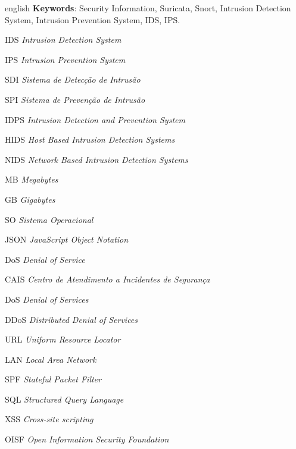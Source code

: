\documentclass[
	12pt,				
	openright,		
	twoside,	
	a4paper,
	english,	
	brazil	
	]{abntex2}
\begin{document}
\begin{resumo}[Abstract]
 \begin{otherlanguage*}{english}
   \vspace{\onelineskip}
   \noindent 
   \textbf{Keywords}: Security Information, Suricata, Snort, Intrusion Detection System, Intrusion Prevention System, IDS, IPS.
 \end{otherlanguage*}
\end{resumo}
\listoffigures*
\cleardoublepage
{}
\listoftables*
\cleardoublepage
\begin{siglas}
  \item[IDS] \textit{Intrusion Detection System}
  \item[IPS] \textit{Intrusion Prevention System}
  \item[SDI] \textit{Sistema de Detecção de Intrusão}
  \item[SPI] \textit{Sistema de Prevenção de Intrusão}
  \item[IDPS] \textit{Intrusion Detection and Prevention System}
  \item[HIDS] \textit{Host Based Intrusion Detection Systems}
  \item[NIDS] \textit{Network Based Intrusion Detection Systems}
  \item[MB] \textit{Megabytes}
  \item[GB] \textit{Gigabytes}
  \item[SO] \textit{Sistema Operacional}
  \item[JSON] \textit{JavaScript Object Notation}
  \item[DoS] \textit{Denial of Service}
  \item[CAIS] \textit{Centro de Atendimento a Incidentes de Segurança}
  \item[DoS] \textit{Denial of Services}
  \item[DDoS] \textit{Distributed Denial of Services}
  \item[URL] \textit{Uniform Resource Locator}
  \item[LAN] \textit{Local Area Network}
  \item[SPF] \textit{Stateful Packet Filter}
  \item[SQL] \textit{Structured Query Language}
  \item[XSS] \textit{Cross-site scripting}
  \item[OISF] \textit{Open Information Security Foundation}
\end{siglas}
\tableofcontents*
\cleardoublepage
\textual





\postextual

\printindex
\end{document}

